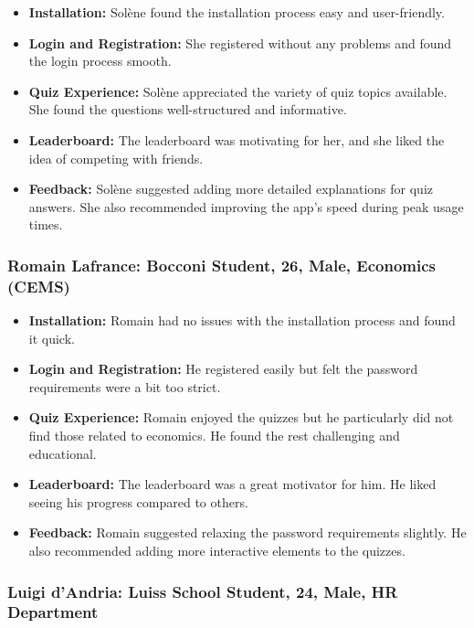 \begin{itemize}
    \item \textbf{Installation:} Solène found the installation process easy and user-friendly.
    \item \textbf{Login and Registration:} She registered without any problems and found the login process smooth.
    \item \textbf{Quiz Experience:} Solène appreciated the variety of quiz topics available. She found the questions well-structured and informative.
    \item \textbf{Leaderboard:} The leaderboard was motivating for her, and she liked the idea of competing with friends.
    \item \textbf{Feedback:} Solène suggested adding more detailed explanations for quiz answers. She also recommended improving the app's speed during peak usage times.
\end{itemize}

\subsubsection{Romain Lafrance: Bocconi Student, 26, Male, Economics (CEMS)}

\begin{itemize}
    \item \textbf{Installation:} Romain had no issues with the installation process and found it quick.
    \item \textbf{Login and Registration:} He registered easily but felt the password requirements were a bit too strict.
    \item \textbf{Quiz Experience:} Romain enjoyed the quizzes but he particularly did not find those related to economics. He found the rest challenging and educational.
    \item \textbf{Leaderboard:} The leaderboard was a great motivator for him. He liked seeing his progress compared to others.
    \item \textbf{Feedback:} Romain suggested relaxing the password requirements slightly. He also recommended adding more interactive elements to the quizzes.
\end{itemize}

\subsubsection{Luigi d’Andria: Luiss School Student, 24, Male, HR Department}

